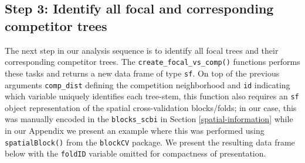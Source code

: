 \documentclass[12pt]{article}
\newenvironment{Shaded}{\begin{snugshade}}{\end{snugshade}}
\newcommand{\AlertTok}[1]{\textcolor[rgb]{0.94,0.16,0.16}{#1}}
\newcommand{\CommentTok}[1]{\textcolor[rgb]{0.56,0.35,0.01}{\textit{#1}}}
\newcommand{\DataTypeTok}[1]{\textcolor[rgb]{0.13,0.29,0.53}{#1}}
\newcommand{\KeywordTok}[1]{\textcolor[rgb]{0.13,0.29,0.53}{\textbf{#1}}}
\newcommand{\NormalTok}[1]{#1}
\newcommand{\OperatorTok}[1]{\textcolor[rgb]{0.81,0.36,0.00}{\textbf{#1}}}
\newcommand{\StringTok}[1]{\textcolor[rgb]{0.31,0.60,0.02}{#1}}
\begin{document}
\hypertarget{focal-vs-comp}{%
\subsection{Step 3: Identify all focal and corresponding competitor
trees}\label{focal-vs-comp}}

The next step in our analysis sequence is to identify all focal trees
and their corresponding competitor trees. The
\texttt{create\_focal\_vs\_comp()} functions performs these tasks and
returns a new data frame of type \texttt{sf}. On top of the previous
arguments \texttt{comp\_dist} defining the competition neighborhood and
\texttt{id} indicating which variable uniquely identifies each
tree-stem, this function also requires an \texttt{sf} object
representation of the spatial cross-validation blocks/folds; in our
case, this was manually encoded in the \texttt{blocks\_scbi} in Section
\ref{spatial-information} while in our Appendix we present an example
where this was performed using \texttt{spatialBlock()} from the
\texttt{blockCV} package. We present the resulting data frame below with
the \texttt{foldID} variable omitted for compactness of presentation.

\begin{Shaded}
\end{Shaded}
\end{document}
